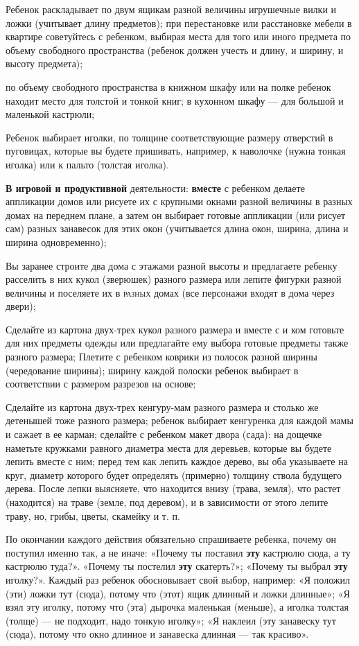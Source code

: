 \documentclass[a5paper]{book}
\begin{document}
Ребенок раскладывает по двум ящикам разной величины игрушечные вилки и
ложки (учитывает длину предметов); при перестановке или расстановке
мебели в квартире советуйтесь с ребенком, выбирая места для того или
иного предмета по объему свободного пространства (ребенок должен учесть
и длину, и ширину, и высоту предмета);

по объему свободного пространства в книжном шкафу или на полке ребенок
находит место для толстой и тонкой книг; в кухонном шкафу --- для
большой и маленькой кастрюли;

Ребенок выбирает иголки, по толщине соответствующие размеру отверстий в
пуговицах, которые вы будете пришивать, например, к наволочке (нужна
тонкая иголка) или к пальто (толстая иголка).

\textbf{В игровой и продуктивной} деятельности: \textbf{вместе} с
ребенком делаете аппликации домов или рисуете их с крупными окнами
разной величины в разных домах на переднем плане, а затем он выбирает
готовые аппликации (или рисует сам) разных занавесок для этих окон
(учитывается длина окон, ширина, длина и ширина одновременно);

Вы заранее строите два дома с этажами разной высоты и предлагаете
ребенку расселить в них кукол (зверюшек) разного размера или лепите
фигурки разной величины и поселяете их в \textsc{разных} домах (все
персонажи входят в дома через двери);

Сделайте из картона двух-трех кукол разного размера и вместе с и ком
готовьте для них предметы одежды или предлагайте ему выбора готовые
предметы также разного размера; Плетите с ребенком коврики из полосок
разной ширины (чередование ширины); ширину каждой полоски ребенок
выбирает в соответствии с размером разрезов на основе;

Сделайте из картона двух-трех кенгуру-мам разного размера и столько же
детенышей тоже разного размера; ребенок выбирает кенгуренка для каждой
мамы и сажает в ее карман; сделайте с ребенком макет двора (сада): на
дощечке наметьте кружками равного диаметра места для деревьев, которые
вы будете лепить вместе с ним; перед тем как лепить каждое дерево, вы
оба указываете на круг, диаметр которого будет определять (примерно)
толщину ствола будущего дерева. После лепки выясняете, что находится
внизу (трава, земля), что растет (находится) на траве (земле, под
деревом), и в зависимости от этого лепите траву, но, грибы, цветы,
скамейку и т. п.

По окончании каждого действия обязательно спрашиваете ребенка, почему он
поступил именно так, а не иначе: «Почему ты поставил \textbf{эту}
кастрюлю сюда, а ту кастрюлю туда?». «Почему ты постелил \textbf{эту}
скатерть?»; «Почему ты выбрал \textbf{эту} иголку?». Каждый раз ребенок
обосновывает свой выбор, например: «Я положил (эти) ложки тут (сюда),
потому что (этот) ящик длинный и ложки длинные»; «Я взял эту иголку,
потому что (эта) дырочка маленькая (меньше), а иголка толстая (толще)
--- не подходит, надо тонкую иголку»; «Я наклеил (эту занавеску тут
(сюда), потому что окно длинное и занавеска длинная --- так красиво».
\end{document}
